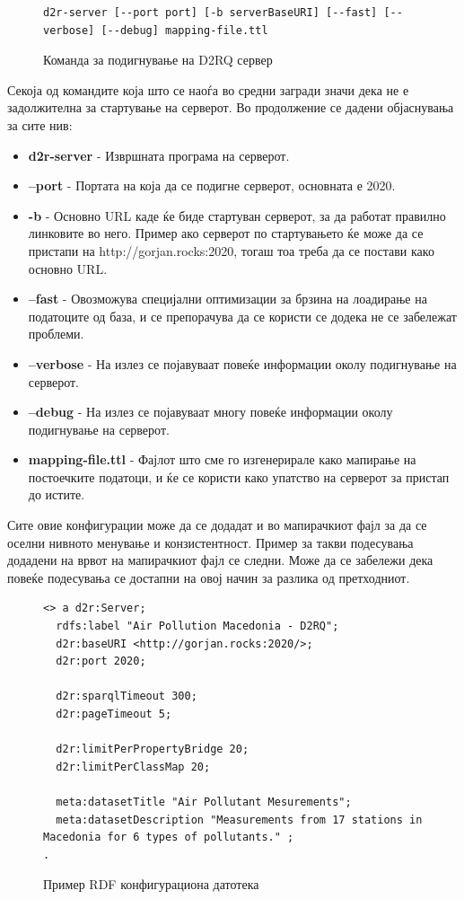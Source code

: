 \documentclass{uvamscse}
\begin{document}
\begin{figure}[H]
\centering
\begin{snippet}
\begin{verbatim}
d2r-server [--port port] [-b serverBaseURI] [--fast] [--verbose] [--debug] mapping-file.ttl
\end{verbatim}
\end{snippet}
\caption{Команда за подигнување на D2RQ сервер}
\label{fig:d2rqrun}
\end{figure}

Секоја од командите која што се наоѓа во средни загради значи дека не е задолжителна за стартување на серверот. Во продолжение се дадени објаснувања за сите нив:

\begin{itemize}
\item \textbf{d2r-server} - Извршната програма на серверот.
\item \textbf{--port} - Портата на која да се подигне серверот, основната е 2020.
\item \textbf{-b} - Основно URL каде ќе биде стартуван серверот, за да работат правилно линковите во него. Пример ако серверот по стартувањето ќе може да се пристапи на http://gorjan.rocks:2020, тогаш тоа треба да се постави како основно URL.
\item \textbf{--fast} - Овозможува специјални оптимизации за брзина на лоадирање на податоците од база, и се препорачува да се користи се додека не се забележат проблеми.
\item \textbf{--verbose} - На излез се појавуваат повеќе информации околу подигнување на серверот.
\item \textbf{--debug} - На излез се појавуваат многу повеќе информации околу подигнување на серверот. 
\item \textbf{mapping-file.ttl} - Фајлот што сме го изгенерирале како мапирање на постоечките податоци, и ќе се користи како упатство на серверот за пристап до истите.
\end{itemize}

Сите овие конфигурации може да се додадат и во мапирачкиот фајл за да се оселни нивното менување и конзистентност. Пример за такви подесувања додадени на врвот на мапирачкиот фајл се следни. Може да се забележи дека повеќе подесувања се достапни на овој начин за разлика од претходниот.

\begin{figure}[H]
\centering
\begin{snippet}
\begin{verbatim}
<> a d2r:Server;
  rdfs:label "Air Pollution Macedonia - D2RQ";
  d2r:baseURI <http://gorjan.rocks:2020/>;
  d2r:port 2020;
  
  d2r:sparqlTimeout 300;
  d2r:pageTimeout 5;

  d2r:limitPerPropertyBridge 20;
  d2r:limitPerClassMap 20;

  meta:datasetTitle "Air Pollutant Mesurements";
  meta:datasetDescription "Measurements from 17 stations in Macedonia for 6 types of pollutants." ;
.
\end{verbatim}
\end{snippet}
\caption{Пример RDF конфигурациона датотека}
\label{fig:conf}
\end{figure}
\end{document}
